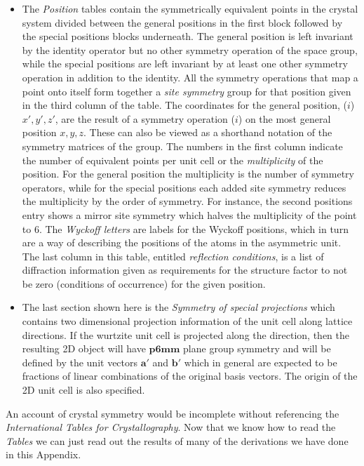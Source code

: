\begin{itemize}
 \item The \textit{Position} tables contain the symmetrically equivalent points in the crystal system divided between the general positions in the first block followed by the special positions blocks underneath. The general position is left invariant by the identity operator but no other symmetry operation of the space group, while the special positions are left invariant by at least one other symmetry operation in addition to the identity. All the symmetry operations that map a point onto itself form together a \textit{site symmetry }group for that position given in the third column of the table. The coordinates for the general position,  ($i$)$x', y', z'$,  are the result of a symmetry operation ($i$) on the most general position $x, y, z$. These can also be viewed as a shorthand notation of the symmetry matrices of the group. The numbers in the first column indicate the number of equivalent points per unit cell or the \textit{multiplicity} of the position. For the general position the multiplicity is the number of symmetry operators, while for the special positions each added site symmetry reduces the multiplicity by the order of symmetry. For instance, the second positions entry shows a mirror site symmetry which halves the multiplicity of the point to 6.  The \textit{Wyckoff letters} are labels for the Wyckoff positions, which in turn are a way of describing the positions of the atoms in the asymmetric unit. The last column in this table, entitled \textit{reflection conditions}, is a list of diffraction information given as requirements for the structure factor to not be zero (conditions of occurrence) for the given position. 
 
 \item The last section shown here is the \textit{Symmetry of special projections} which contains two dimensional projection information of the unit cell along lattice directions. If the wurtzite unit cell is projected along the \hkl[100] direction, then the resulting 2D object will have $\mathbf{p6mm}$ plane group symmetry and will be defined by the unit vectors $\mathbf{a'}$ and $\mathbf{b'}$ which in general are expected to be fractions of linear combinations of the original basis vectors. The origin of the 2D unit cell is also specified.  
\end{itemize}

 
An account of crystal symmetry would be incomplete without referencing the \textit{International Tables for Crystallography}. Now that we know how to read the \textit{Tables} we can just read out the results of many of the derivations we have done in this Appendix. 
